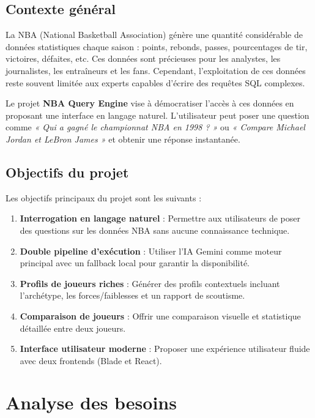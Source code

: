\documentclass[12pt,a4paper]{report}
\begin{document}
\subsection{Contexte général}

La NBA (National Basketball Association) génère une quantité considérable de données statistiques chaque saison : points, rebonds, passes, pourcentages de tir, victoires, défaites, etc. Ces données sont précieuses pour les analystes, les journalistes, les entraîneurs et les fans. Cependant, l'exploitation de ces données reste souvent limitée aux experts capables d'écrire des requêtes SQL complexes.

Le projet \textbf{NBA Query Engine} vise à démocratiser l'accès à ces données en proposant une interface en langage naturel. L'utilisateur peut poser une question comme \textit{« Qui a gagné le championnat NBA en 1998 ? »} ou \textit{« Compare Michael Jordan et LeBron James »} et obtenir une réponse instantanée.

\subsection{Objectifs du projet}

Les objectifs principaux du projet sont les suivants :

\begin{enumerate}[leftmargin=*]
    \item \textbf{Interrogation en langage naturel} : Permettre aux utilisateurs de poser des questions sur les données NBA sans aucune connaissance technique.
    \item \textbf{Double pipeline d'exécution} : Utiliser l'IA Gemini comme moteur principal avec un fallback local pour garantir la disponibilité.
    \item \textbf{Profils de joueurs riches} : Générer des profils contextuels incluant l'archétype, les forces/faiblesses et un rapport de scoutisme.
    \item \textbf{Comparaison de joueurs} : Offrir une comparaison visuelle et statistique détaillée entre deux joueurs.
    \item \textbf{Interface utilisateur moderne} : Proposer une expérience utilisateur fluide avec deux frontends (Blade et React).
\end{enumerate}

\section{Analyse des besoins}
\end{document}
